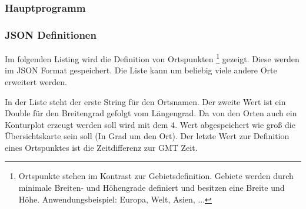 \documentclass[a4paper,oneside,12pt,titlepage]{article}
\newcommand{\vsr}{ViSys}
\newcommand{\pyvidir}{../../Code/PyVi/}	%
\begin{document}
\subsubsection*{Hauptprogramm}







\subsubsection*{JSON Definitionen}
Im folgenden Listing wird die Definition von Ortspunkten
\footnote{Ortspunkte stehen im Kontrast zur Gebietsdefinition. Gebiete werden durch minimale Breiten- und Höhengrade definiert und besitzen eine Breite und Höhe. Anwendungsbeispiel: Europa, Welt, Asien, ...} gezeigt. Diese werden im JSON Format gespeichert. Die Liste kann um beliebig viele andere Orte erweitert werden.

In der Liste steht der erste String für den Ortsnamen. Der zweite Wert ist ein Double für den Breitengrad gefolgt vom Längengrad. Da von den Orten auch ein Konturplot erzeugt werden soll wird mit dem 4. Wert abgespeichert wie groß die Übersichtskarte sein soll (In Grad um den Ort). Der letzte Wert zur Definition eines Ortspunktes ist die Zeitdifferenz zur GMT Zeit.
\end{document}
